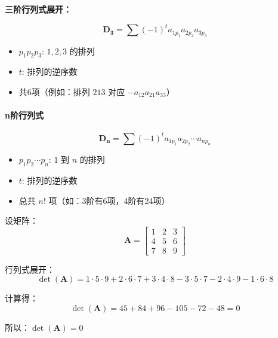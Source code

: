 \begin{flushleft}
	\textbf{三阶行列式展开：}
\end{flushleft}

\begin{equation}
\mathbf{D_3} = \sum (-1)^t a_{1p_1}a_{2p_2}a_{3p_3}
\end{equation}

\begin{itemize}
	\item $p_1p_2p_3$: $1,2,3$ 的排列
	\item $t$: 排列的逆序数
	\item 共6项（例如：排列 $213$ 对应 $-a_{12}a_{21}a_{33}$）
\end{itemize}

\paragraph*{n阶行列式}
\begin{equation}
	\mathbf{D_n} = \sum (-1)^t a_{1p_1} a_{2p_2} \cdots a_{np_n}
\end{equation}
\begin{itemize}
	\item $p_1 p_2 \cdots p_n$: $1$ 到 $n$ 的排列
	\item $t$: 排列的逆序数
	\item 总共 $n!$ 项（如：3阶有6项，4阶有24项）
\end{itemize}

\vspace{0.7em}
\begin{example}
	
	\noindent 设矩阵：
		\begin{equation}
		\mathbf{A} = \begin{bmatrix}
			1 & 2 & 3 \\
			4 & 5 & 6 \\
			7 & 8 & 9
		\end{bmatrix}
		\end{equation}
		
	\noindent 行列式展开：
		\begin{equation}
		\det(\mathbf{A}) = 
		1 \cdot 5 \cdot 9 + 2 \cdot 6 \cdot 7 + 3 \cdot 4 \cdot 8
		- 3 \cdot 5 \cdot 7 - 2 \cdot 4 \cdot 9 - 1 \cdot 6 \cdot 8
		\end{equation}
		
	\noindent 计算得：
		\begin{equation}
		\det(\mathbf{A}) = 45 + 84 + 96 - 105 - 72 - 48 = 0
		\end{equation}
		
	\noindent 所以：$\det(\mathbf{A}) = 0$
\end{example}

